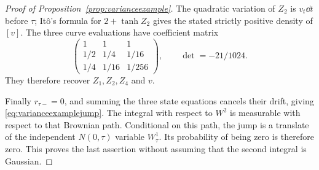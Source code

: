 \begin{proof}[Proof of Proposition~\ref{prop:varianceexample}]
The quadratic variation of $Z_2$ is $v_t\dd t$ before $\tau$; It\^o's formula for $2+\tanh Z_2$ gives the stated strictly positive density of $[v]$. The three curve evaluations have coefficient matrix
\[
\begin{pmatrix}
1&1&1\\[2pt]
1/2&1/4&1/16\\[2pt]
1/4&1/16&1/256
\end{pmatrix},\qquad \det=-21/1024.
\]
They therefore recover $Z_1,Z_2,Z_4$ and $v$.

Finally $r_{\tau-}=0$, and summing the three state equations cancels their drift, giving \eqref{eq:varianceexamplejump}. The integral with respect to $W^2$ is measurable with respect to that Brownian path. Conditional on this path, the jump is a translate of the independent $N(0,\tau)$ variable $W^1_\tau$. Its probability of being zero is therefore zero. This proves the last assertion without assuming that the second integral is Gaussian.
\end{proof}

